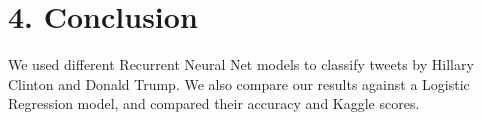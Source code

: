 
\section*{4. Conclusion}

We used different Recurrent Neural Net models to classify tweets by Hillary Clinton and Donald Trump. We also compare our results against a Logistic Regression model, and compared their accuracy and Kaggle scores. 
